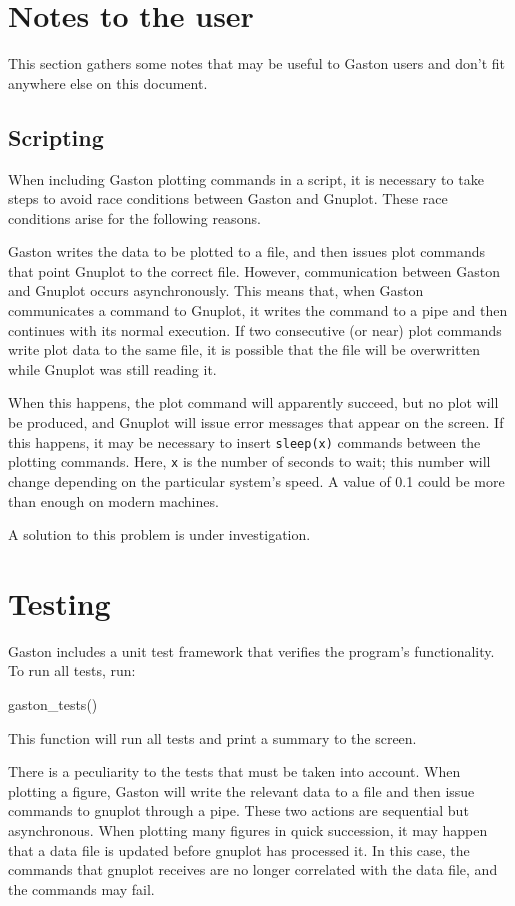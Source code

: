\documentclass[11pt]{article}
\newcommand{\cmd}[1]{\texttt{#1}}
\begin{document}
\section{Notes to the user}

This section gathers some notes that may be useful to Gaston users and don't
fit anywhere else on this document.

\subsection{Scripting}
When including Gaston plotting commands in a script, it is necessary to take
steps to avoid race conditions between Gaston and Gnuplot. These race
conditions arise for the following reasons.

Gaston writes the data to be plotted to a file, and then issues plot commands
that point Gnuplot to the correct file. However, communication between Gaston
and Gnuplot occurs asynchronously. This means that, when Gaston communicates a
command to Gnuplot, it writes the command to a pipe and then continues with its
normal execution.  If two consecutive (or near) plot commands write plot data
to the same file, it is possible that the file will be overwritten while
Gnuplot was still reading it.

When this happens, the plot command will apparently succeed, but no plot will
be produced, and Gnuplot will issue error messages that appear on the screen.
If this happens, it may be necessary to insert \cmd{sleep(x)} commands between
the plotting commands. Here, \cmd{x} is the number of seconds to wait; this
number will change depending on the particular system's speed. A value
of 0.1 could be more than enough on modern machines.

A solution to this problem is under investigation.

\section{Testing}
\label{tests}

Gaston includes a unit test framework that verifies the program's
functionality. To run all tests, run:
\begin{juliacode}
gaston_tests()
\end{juliacode}
This function will run all tests and print a summary to the screen.

There is a peculiarity to the tests that must be taken into account. When
plotting a figure, Gaston will write the relevant data to a file and then issue
commands to gnuplot through a pipe. These two actions are sequential but
asynchronous. When plotting many figures in quick succession, it may happen
that a data file is updated before gnuplot has processed it. In this case, the
commands that gnuplot receives are no longer correlated with the data file, and
the commands may fail.
\end{document}
